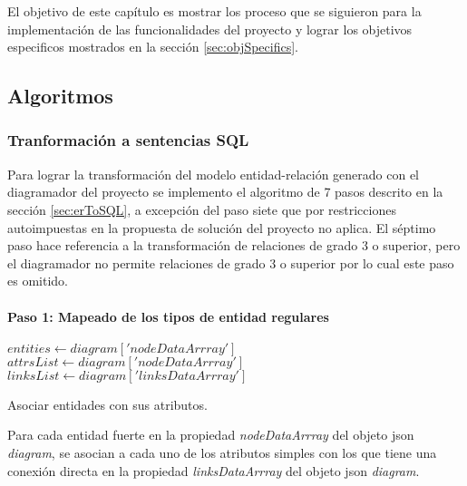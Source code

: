 El objetivo de este capítulo es mostrar los proceso que se siguieron para la implementación de las funcionalidades del proyecto y lograr los objetivos especificos mostrados en la sección \ref{sec:objSpecifics}.

\subsection{Algoritmos}

\subsubsection{Tranformación a sentencias SQL}

Para lograr la transformación del modelo entidad-relación generado con el diagramador del proyecto se implemento el algoritmo de 7 pasos descrito en la sección \ref{sec:erToSQL}, a excepción del paso siete que por restricciones autoimpuestas en la propuesta de solución del proyecto no aplica. El séptimo paso hace referencia a la transformación de relaciones de grado 3 o superior, pero el diagramador no permite relaciones de grado 3 o superior por lo cual este paso es omitido.

\paragraph*{Paso 1: Mapeado de los tipos de entidad regulares}

\begin{algorithm}[H]

  $entities \gets diagram['nodeDataArrray']$\\
  $attrsList \gets diagram['nodeDataArrray']$\\
  $linksList \gets diagram['linksDataArrray']$\\
   {
  }
  \caption{Asociar entidades con sus atributos.}
\end{algorithm}

Para cada entidad fuerte en la propiedad \textit{nodeDataArrray} del objeto json \textit{diagram}, se asocian a cada uno de los atributos simples con los que tiene una conexión directa en la propiedad \textit{linksDataArrray} del objeto json \textit{diagram}.

